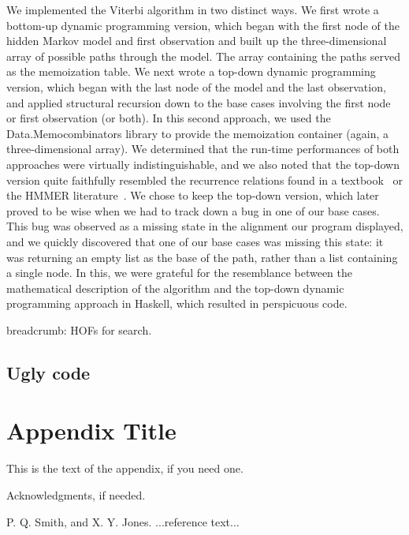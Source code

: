 \documentclass[preprint]{sigplanconf}
\begin{document}
We implemented the Viterbi algorithm in two distinct ways. We first wrote a 
bottom-up dynamic programming version, which began with the first node of the 
hidden Markov model and first observation and built up the three-dimensional 
array of possible paths through the model. The array containing the paths 
served as the memoization table. We next wrote a top-down dynamic programming 
version, which began with the last node of the model and the last observation, 
and applied structural recursion down to the base cases involving the first 
node or first observation (or both). In this second approach, we used the 
Data.Memocombinators library to provide the memoization container (again, a 
three-dimensional array). We determined that the run-time performances of both 
approaches were virtually indistinguishable, and we also noted that the 
top-down version quite faithfully resembled the recurrence relations found in a 
textbook~\cite{durbin} or the HMMER literature~\cite{eddy}. We chose to keep 
the top-down version, which later proved to be wise when we had to track down a 
bug in one of our base cases. This bug was observed as a missing state in the 
alignment our program displayed, and we quickly discovered that one of our base 
cases was missing this state: it was returning an empty list as the base of the 
path, rather than a list containing a single node. In this, we were grateful 
for the resemblance between the mathematical description of the algorithm and 
the top-down dynamic programming approach in Haskell, which resulted in 
perspicuous code.

breadcrumb: HOFs for search.







\subsection{Ugly code}




\appendix
\section{Appendix Title}

This is the text of the appendix, if you need one.

\acks

Acknowledgments, if needed.





\begin{thebibliography}{}
\softraggedright

P. Q. Smith, and X. Y. Jones. ...reference text...

\end{thebibliography}
\end{document}
